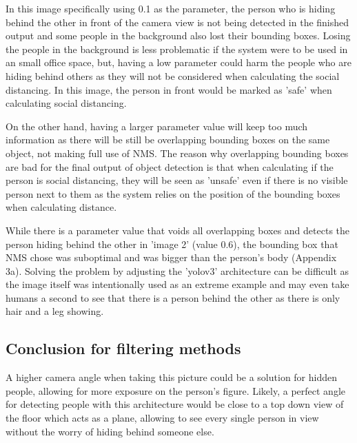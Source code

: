 \documentclass[12pt]{report}
\begin{document}
\vspace{2mm}

In this image specifically using 0.1 as the parameter, the person who is hiding behind the other in front of the camera view is not being detected in the finished output and some people in the background also lost their bounding boxes. Losing the people in the background is less problematic if the system were to be used in an small office space, but, having a low parameter could harm the people who are hiding behind others as they will not be considered when calculating the social distancing. In this image, the person in front would be marked as 'safe' when calculating social distancing.

\vspace{2mm}

On the other hand, having a larger parameter value will keep too much information as there will be still be overlapping bounding boxes on the same object, not making full use of NMS. The reason why overlapping bounding boxes are bad for the final output of object detection is that when calculating if the person is social distancing, they will be seen as 'unsafe' even if there is no visible person next to them as the system relies on the position of the bounding boxes when calculating distance.

\vspace{2mm}

While there is a parameter value that voids all overlapping boxes and detects the person hiding behind the other in 'image 2' (value 0.6), the bounding box that NMS chose was suboptimal and was bigger than the person's body (Appendix 3a). Solving the problem by adjusting the 'yolov3' architecture can be difficult as the image itself was intentionally used as an extreme example and may even take humans a second to see that there is a person behind the other as there is only hair and a leg showing.

\subsection*{Conclusion for filtering methods}

A higher camera angle when taking this picture could be a solution for hidden people, allowing for more exposure on the person's figure. Likely, a perfect angle for detecting people with this architecture would be close to a top down view of the floor which acts as a plane, allowing to see every single person in view without the worry of hiding behind someone else.
\end{document}
